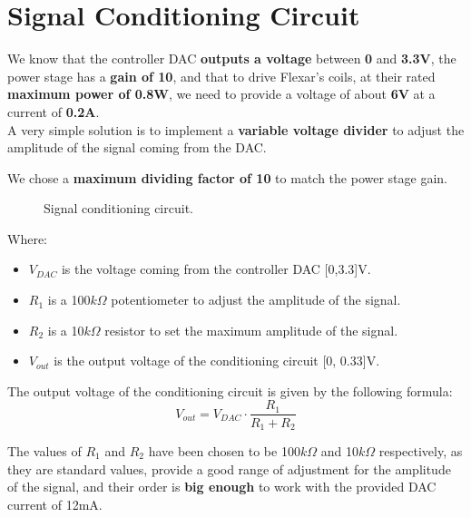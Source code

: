 \section{Signal Conditioning Circuit}
\label{Signal_Conditioning_Circuit}
We know that the controller DAC \textbf{outputs a voltage} between \textbf{0} and \textbf{3.3V}, the power stage has a \textbf{gain of 10}, and that to drive Flexar's coils, at their rated \textbf{maximum power of 0.8W}, we need to provide a voltage of about \textbf{6V} at a current of \textbf{0.2A}. \\
A very simple solution is to implement a \textbf{variable voltage divider} to adjust the amplitude of the signal coming from the DAC.

\begin{samepage}
    We chose a \textbf{maximum dividing factor of 10} to match the power stage gain.
    \nopagebreak

    \begin{figure}[H]
        \centering
        \resizebox{.5\linewidth}{!}{
            
        }
        \caption{Signal conditioning circuit.}
        \label{fig:cond_circuit}
    \end{figure}
    \nopagebreak

    Where:
    \nopagebreak

    \begin{itemize}
        \item $V_{DAC}$ is the voltage coming from the controller DAC [0,3.3]V.
        \item $R_1$ is a 100$k\Omega$ potentiometer to adjust the amplitude of the signal.
        \item $R_2$ is a 10$k\Omega$ resistor to set the maximum amplitude of the signal.
        \item $V_{out}$ is the output voltage of the conditioning circuit [0, 0.33]V.
    \end{itemize}
\end{samepage}

The output voltage of the conditioning circuit is given by the following formula:
\begin{equation*}
    V_{out} = V_{DAC} \cdot \frac{R_1}{R_1 + R_2}
\end{equation*}

The values of $R_1$ and $R_2$ have been chosen to be 100$k\Omega$ and 10$k\Omega$ respectively, as they are standard values, provide a good range of adjustment for the amplitude of the signal, and their order is \textbf{big enough} to work with the provided DAC current of 12mA.